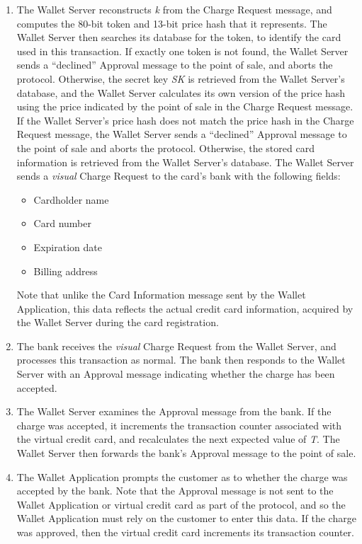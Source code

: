 \begin{enumerate}
\item The Wallet Server reconstructs \emph{k} from the Charge Request message, and computes the 80-bit token and 13-bit price hash that it represents.
    The Wallet Server then searches its database for the token, to identify the card used in this transaction.
    If exactly one token is not found, the Wallet Server sends a ``declined'' Approval message to the point of sale, and aborts the protocol.
    Otherwise, the secret key \emph{SK} is retrieved from the Wallet Server's database, and the Wallet Server calculates its own version of the price hash
        using the price indicated by the point of sale in the Charge Request message.
    If the Wallet Server's price hash does not match the price hash in the Charge Request message,
        the Wallet Server sends a ``declined'' Approval message to the point of sale and aborts the protocol.
    Otherwise, the stored card information is retrieved from the Wallet Server's database.
    The Wallet Server sends a \emph{visual} Charge Request to the card's bank with the following fields:
    \begin{itemize}
    \item Cardholder name
    \item Card number
    \item Expiration date
    \item Billing address
    \end{itemize}
    Note that unlike the Card Information message sent by the Wallet Application, this data reflects the actual credit card information,
        acquired by the Wallet Server during the card registration.

\item The bank receives the \emph{visual} Charge Request from the Wallet Server, and processes this transaction as normal.
    The bank then responds to the Wallet Server with an Approval message indicating whether the charge has been accepted.

\item The Wallet Server examines the Approval message from the bank.
    If the charge was accepted, it increments the transaction counter associated with the virtual credit card, and recalculates the next expected value of \emph{T}.
    The Wallet Server then forwards the bank's Approval message to the point of sale.

\item The Wallet Application prompts the customer as to whether the charge was accepted by the bank.
    Note that the Approval message is not sent to the Wallet Application or virtual credit card as part of the protocol,
        and so the Wallet Application must rely on the customer to enter this data.
    If the charge was approved, then the virtual credit card increments its transaction counter.
\end{enumerate}

